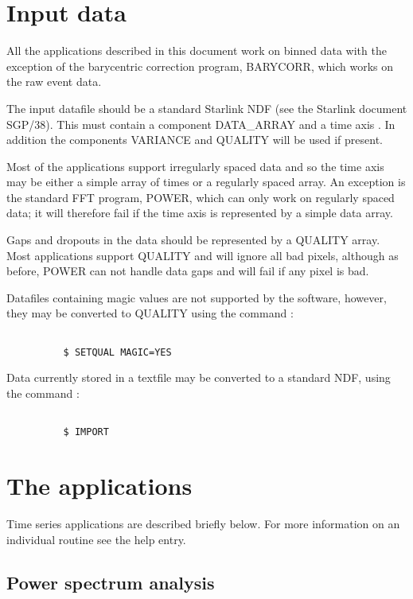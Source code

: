 \section{Input data}

All the applications described in this document work on binned
data with the exception of the barycentric correction program,
BARYCORR, which works on the raw event data.

The input datafile should be a standard Starlink NDF (see the Starlink
document SGP/38). This must contain a component DATA\_ARRAY and a time
axis . In addition the components VARIANCE and QUALITY will be 
used if present. 

Most of the applications support irregularly spaced data and so the
time axis may be either a simple array of times or a regularly spaced
array. An exception is the standard FFT program, POWER, which can
only work on regularly spaced data; it will therefore fail if the time
axis is represented by a simple data array.

Gaps and dropouts in the data should be represented by a QUALITY array.
Most applications support QUALITY and will ignore all bad pixels, 
although as before, POWER can not handle data gaps and will fail if
any pixel is bad.

Datafiles containing magic values are not supported by the software,
however, they may be converted to QUALITY using the command :

\begin{verbatim}

          $ SETQUAL MAGIC=YES

\end{verbatim}

Data currently stored in a textfile may be converted to a standard
NDF, using the command :

\begin{verbatim}

          $ IMPORT

\end{verbatim}

\newpage

\section{The applications}
Time series applications are described briefly below. For more information
on an individual routine see the help entry. 

\subsection{Power spectrum analysis}

